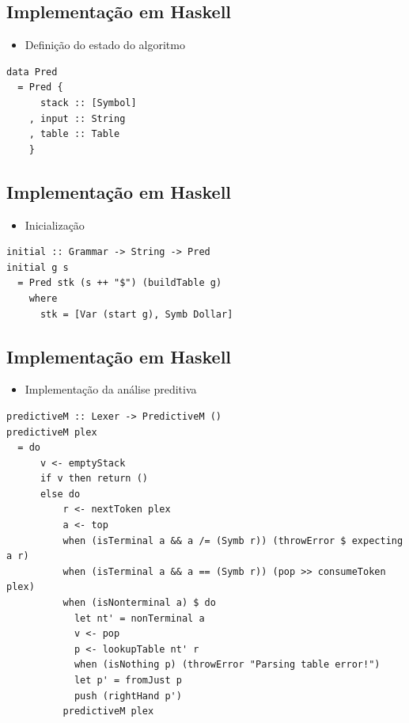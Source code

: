 \documentclass[11pt]{article}
\begin{document}
\subsection*{Implementação em Haskell}
\label{sec:org25fb91d}

\begin{itemize}
\item Definição do estado do algoritmo
\end{itemize}

\begin{verbatim}
data Pred
  = Pred {
      stack :: [Symbol]
    , input :: String
    , table :: Table
    }
\end{verbatim}
\subsection*{Implementação em Haskell}
\label{sec:org7d87b40}

\begin{itemize}
\item Inicialização
\end{itemize}

\begin{verbatim}
initial :: Grammar -> String -> Pred
initial g s
  = Pred stk (s ++ "$") (buildTable g)
    where
      stk = [Var (start g), Symb Dollar]
\end{verbatim}
\subsection*{Implementação em Haskell}
\label{sec:orgbd583fc}

\begin{itemize}
\item Implementação da análise preditiva
\end{itemize}

\begin{verbatim}
predictiveM :: Lexer -> PredictiveM ()
predictiveM plex
  = do
      v <- emptyStack
      if v then return ()
      else do
          r <- nextToken plex
          a <- top
          when (isTerminal a && a /= (Symb r)) (throwError $ expecting a r)
          when (isTerminal a && a == (Symb r)) (pop >> consumeToken plex)
          when (isNonterminal a) $ do
            let nt' = nonTerminal a
            v <- pop
            p <- lookupTable nt' r
            when (isNothing p) (throwError "Parsing table error!")
            let p' = fromJust p
            push (rightHand p')
          predictiveM plex
\end{verbatim}
\end{document}
